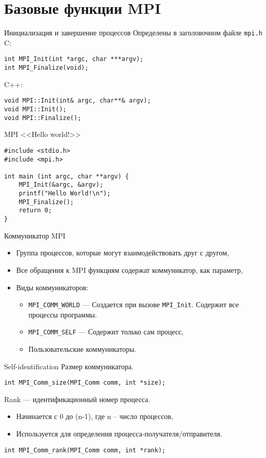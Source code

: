 \section{Базовые функции MPI}

\begin{frame}[fragile]{Инициализация и завершение процессов}
Определены в заголовочном файле \texttt{mpi.h}
\vfill
C:
\begin{lstlisting}
int MPI_Init(int *argc, char ***argv);
int MPI_Finalize(void);
\end{lstlisting}
\vfill
C++:
\begin{lstlisting}
void MPI::Init(int& argc, char**& argv);
void MPI::Init();
void MPI::Finalize();
\end{lstlisting}
\end{frame}

\begin{frame}[fragile]{MPI <<Hello world!>>}
\begin{lstlisting}
#include <stdio.h>
#include <mpi.h>

int main (int argc, char **argv) {
    MPI_Init(&argc, &argv);
    printf("Hello World!\n");
    MPI_Finalize();
    return 0;
}
\end{lstlisting}
\end{frame}

\begin{frame}{Коммуникатор MPI}
\begin{itemize}
    \item Группа процессов, которые могут взаимодействовать друг с другом,
    \item Все обращения к MPI функциям содержат коммуникатор, как параметр,
    \vfill
    \item Виды коммуникаторов:
    \begin{itemize}
        \item \texttt{MPI_COMM_WORLD} --- Создается при вызове \texttt{MPI_Init}.
        Содержит все процессы программы.
        \item \texttt{MPI_COMM_SELF} --- Содержит только сам процесс,
        \item Пользовательские коммуникаторы.
    \end{itemize}
\end{itemize}
\end{frame}

\begin{frame}[fragile]{Self-identification}
Размер коммуникатора.
\begin{lstlisting}
int MPI_Comm_size(MPI_Comm comm, int *size);
\end{lstlisting}
\vfill
Rank --- идентификационный номер процесса.
\begin{itemize}
    \item Начинается с 0 до (n-1), где n -- число процессов,
    \item Используется для определения процесса-получателя/отправителя.
\end{itemize}
\begin{lstlisting}
int MPI_Comm_rank(MPI_Comm comm, int *rank);
\end{lstlisting}
\end{frame}

